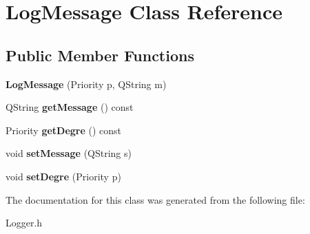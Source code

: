 \hypertarget{class_log_message}{\section{Log\-Message Class Reference}
\label{class_log_message}
}
\subsection*{Public Member Functions}
\begin{DoxyCompactItemize}
\item 
\hypertarget{class_log_message_a877e3559f31a6d3d2bde5af81c463793}{{\bfseries Log\-Message} (Priority p, Q\-String m)}\label{class_log_message_a877e3559f31a6d3d2bde5af81c463793}

\item 
\hypertarget{class_log_message_acc855cee5e2033d264b3ed830d9a0939}{Q\-String {\bfseries get\-Message} () const }\label{class_log_message_acc855cee5e2033d264b3ed830d9a0939}

\item 
\hypertarget{class_log_message_a1ad8edf16b9f7d748c2960361d0d7b94}{Priority {\bfseries get\-Degre} () const }\label{class_log_message_a1ad8edf16b9f7d748c2960361d0d7b94}

\item 
\hypertarget{class_log_message_aab0be2a0e35b66bb0d5f8e1dc9701c5d}{void {\bfseries set\-Message} (Q\-String s)}\label{class_log_message_aab0be2a0e35b66bb0d5f8e1dc9701c5d}

\item 
\hypertarget{class_log_message_ab9cfd9695f1e0d486dd2bdeb03f29e8d}{void {\bfseries set\-Degre} (Priority p)}\label{class_log_message_ab9cfd9695f1e0d486dd2bdeb03f29e8d}

\end{DoxyCompactItemize}


The documentation for this class was generated from the following file\-:\begin{DoxyCompactItemize}
\item 
Logger.\-h\end{DoxyCompactItemize}
